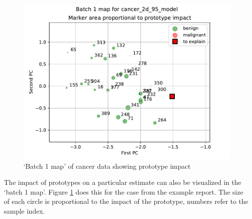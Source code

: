 %
\begin{figure}
\caption{`Batch 1 map' of cancer data showing prototype impact}
\label{fig_batch_1_map_impact}
%
\begin{center}
\includegraphics[height=0.4\textheight]{figures/cancer_batch_1_map_impact.pdf}
\end{center}
\end{figure}
%
The impact of prototypes on a particular estimate can also be visualized in the `batch 1 map'.
Figure \ref{fig_batch_1_map_impact} does this for the case from the example report.
The size of each circle is proportional to the impact of the prototype, numbers refer to the sample index.
%
